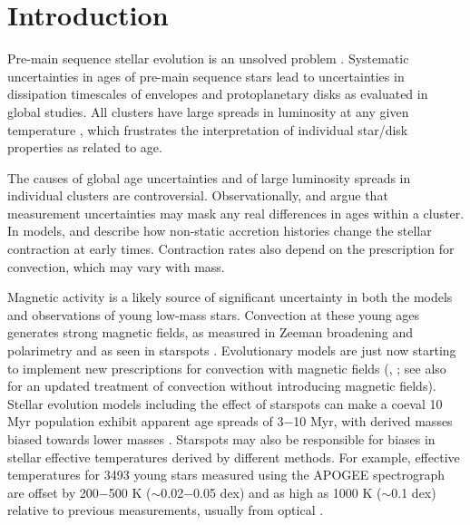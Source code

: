 \documentclass[12pt]{report}
\begin{document}
\tableofcontents
\listoftables
\listoffigures

\section{Introduction}\label{sec:intro}


Pre-main sequence stellar evolution is an unsolved problem \citep[see review by][]{soderblom14}.  Systematic uncertainties in ages of pre-main sequence stars lead to uncertainties in dissipation timescales of envelopes and protoplanetary disks as evaluated in global studies.  All clusters have large spreads in luminosity at any given temperature \citep[e.g.][]{reggiani11}, which frustrates the interpretation of individual star/disk properties as related to age.  

The causes of global age uncertainties and of large luminosity spreads in individual clusters are controversial.  Observationally, \citet{hartmann01} and \citet{slesnick08} argue that measurement uncertainties may mask any real differences in ages within a cluster.  In models, \citet{hartmann97} and \citet{baraffe09} describe how non-static accretion histories change the stellar contraction at early times.  Contraction rates also depend on the prescription for convection, which may vary with mass.

Magnetic activity is a likely source of significant uncertainty in both the models and observations of young low-mass stars. Convection at these young ages generates strong magnetic fields, as measured in Zeeman broadening and polarimetry \citep[e.g.][]{johnskrull07,donati09} and as seen in starspots \citep[e.g.][]{stauffer03,grankin08}.  Evolutionary models are just now starting to implement new prescriptions for convection with magnetic fields (\citet{somers15}, \citet{feiden16}; see also \citet{baraffe15} for an updated treatment of convection without introducing magnetic fields).  Stellar evolution models including the effect of starspots can make a coeval 10 Myr population exhibit apparent age spreads of 3$-$10 Myr, with derived masses biased towards lower masses \citep{somers15}.  Starspots may also be responsible for biases in stellar effective temperatures derived by different methods.  For example, effective temperatures for 3493 young stars measured using the APOGEE spectrograph \citep[$1.5-1.70 \;\mu$m at $R=22,500$][]{wilson10} are offset by 200$-$500 K ($\sim$0.02$-$0.05 dex) and as high as 1000 K ($\sim$0.1 dex) relative to previous measurements, usually from optical \citep{cottaar14}.  
\end{document}
